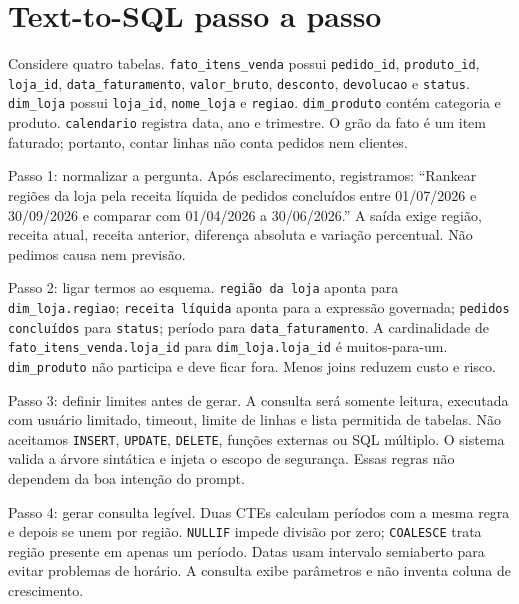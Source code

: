 \section{Text-to-SQL passo a passo}

Considere quatro tabelas. \texttt{fato\_itens\_venda} possui \texttt{pedido\_id}, \texttt{produto\_id}, \texttt{loja\_id}, \texttt{data\_faturamento}, \texttt{valor\_bruto}, \texttt{desconto}, \texttt{devolucao} e \texttt{status}. \texttt{dim\_loja} possui \texttt{loja\_id}, \texttt{nome\_loja} e \texttt{regiao}. \texttt{dim\_produto} contém categoria e produto. \texttt{calendario} registra data, ano e trimestre. O grão da fato é um item faturado; portanto, contar linhas não conta pedidos nem clientes.

Passo 1: normalizar a pergunta. Após esclarecimento, registramos: ``Rankear regiões da loja pela receita líquida de pedidos concluídos entre 01/07/2026 e 30/09/2026 e comparar com 01/04/2026 a 30/06/2026.'' A saída exige região, receita atual, receita anterior, diferença absoluta e variação percentual. Não pedimos causa nem previsão.

Passo 2: ligar termos ao esquema. \texttt{região da loja} aponta para \texttt{dim\_loja.regiao}; \texttt{receita líquida} aponta para a expressão governada; \texttt{pedidos concluídos} para \texttt{status}; período para \texttt{data\_faturamento}. A cardinalidade de \texttt{fato\_itens\_venda.loja\_id} para \texttt{dim\_loja.loja\_id} é muitos-para-um. \texttt{dim\_produto} não participa e deve ficar fora. Menos joins reduzem custo e risco.

Passo 3: definir limites antes de gerar. A consulta será somente leitura, executada com usuário limitado, timeout, limite de linhas e lista permitida de tabelas. Não aceitamos \texttt{INSERT}, \texttt{UPDATE}, \texttt{DELETE}, funções externas ou SQL múltiplo. O sistema valida a árvore sintática e injeta o escopo de segurança. Essas regras não dependem da boa intenção do prompt.

Passo 4: gerar consulta legível. Duas CTEs calculam períodos com a mesma regra e depois se unem por região. \texttt{NULLIF} impede divisão por zero; \texttt{COALESCE} trata região presente em apenas um período. Datas usam intervalo semiaberto para evitar problemas de horário. A consulta exibe parâmetros e não inventa coluna de crescimento.

